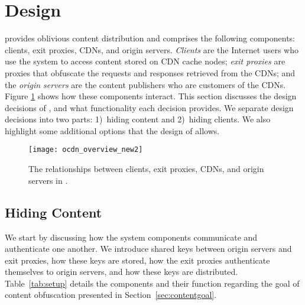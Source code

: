 \section{\system{} Design}
\label{sec:design}

\system{} provides oblivious content distribution and  
comprises the following components: clients, exit proxies, CDNs, and origin 
servers.  {\em Clients} are the Internet users who use the system to access content
stored on CDN cache nodes; {\em exit proxies} are proxies that obfuscate the requests
and responses retrieved from the CDNs; and the {\em origin servers} are the content
publishers who are customers of the CDNs.  Figure \ref{fig:ocd_overview} shows how
these components interact.  This section discusses the design decisions of \system{}, and what functionality each decision provides.  
We separate design decisions into two parts: 1)~hiding content and 2)~hiding clients.  We also highlight some additional options that the design of 
\system{} allows.

\begin{figure}[t!]
\centering
\texttt{[image: ocdn\_overview\_new2]}
\caption{The relationships between clients, exit proxies, CDNs, and origin servers in 
\system{}.}
\label{fig:ocd_overview}
\end{figure}


\subsection{Hiding Content}
\label{sec:hiding_content}

We start by discussing how the system components communicate and authenticate one another. 
We introduce shared keys between origin servers and exit proxies, how these keys
are stored, how the exit proxies authenticate themselves to origin servers, and how these 
keys are distributed. Table~\ref{tab:setup} details the components and their function 
regarding the goal of content obfuscation presented in Section~\ref{sec:contentgoal}.


